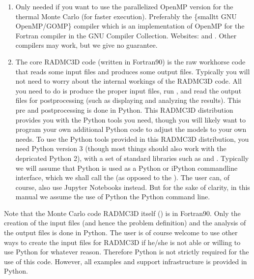 \documentclass[letterpaper,10pt,english]{sphinxmanual}
\begin{document}
\begin{enumerate}
\item {} 

Only needed if you want to use the parallelized OpenMP version for the thermal
Monte Carlo (for faster execution). Preferably the \{smalltt GNU OpenMP/GOMP\}
compiler which is an implementation of OpenMP for the Fortran compiler in the
GNU Compiler Collection. Websites:  and
. Other compilers may work, but we give no
guarantee.

\item {} 

The core RADMC\sphinxhyphen{}3D code  (written in Fortran\sphinxhyphen{}90) is the
raw workhorse code that reads some input files and produces some output
files. Typically you will not need to worry about the internal workings of the
RADMC\sphinxhyphen{}3D code. All you need to do is produce the proper input files, run
, and read the output files for post\sphinxhyphen{}processing (such as
displaying and analyzing the results). This pre\sphinxhyphen{} and post\sphinxhyphen{}processing is
done in Python. This RADMC\sphinxhyphen{}3D distribution provides you with the Python tools
you need, though you will likely want to program your own additional Python code
to adjust the models to your own needs. To use the Python tools provided in
this RADMC\sphinxhyphen{}3D distribution, you need Python version 3
(though most things should also work with the depricated Python 2), with a
set of standard libraries such as  and .
Typically we will assume that Python is used as a Python or iPython command\sphinxhyphen{}line
interface, which we shall call the  (as opposed to the
). The user can, of course, also use Jupyter Notebooks instead.
But for the sake of clarity, in this manual we assume the use of Python the
Python command line.

\end{enumerate}

Note that the Monte Carlo code RADMC\sphinxhyphen{}3D itself () is in Fortran\sphinxhyphen{}90. Only the
creation of the input files (and hence the problem definition) and the analysis
of the output files is done in Python. The user is of course welcome to use
other ways to create the input files for RADMC\sphinxhyphen{}3D if he/she is not able or
willing to use Python for whatever reason. Therefore Python is not strictly
required for the use of this code. However, all examples and support
infrastructure is provided in Python.
\end{document}
